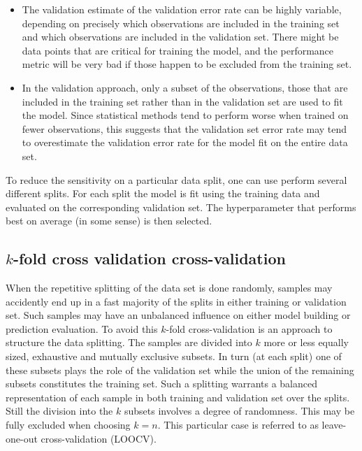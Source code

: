 \documentclass[%
oneside,                 %
final,                   %
10pt]{article}
\begin{document}
\begin{itemize}
\item The validation estimate of the validation error rate can be highly variable, depending on precisely which observations are included in the training set and which observations are included in the validation set. There might be data points that are critical for training the model, and the performance metric will be very bad if those happen to be excluded from the training set.

\item In the validation approach, only a subset of the observations, those that are included in the training set rather than in the validation set are used to fit the model. Since statistical methods tend to perform worse when trained on fewer observations, this suggests that the validation set error rate may tend to overestimate the validation error rate for the model fit on the entire data set.
\end{itemize}

\noindent
To reduce the sensitivity on a particular data split, one can use perform several different splits. For each split the model is fit using the training data and
evaluated on the corresponding validation set. The hyperparameter that performs best on average (in some sense) is then selected.


\subsection{$k$-fold cross validation cross-validation}

When the repetitive splitting of the data set is done randomly,
samples may accidently end up in a fast majority of the splits in
either training or validation set. Such samples may have an unbalanced
influence on either model building or prediction evaluation. To avoid
this $k$-fold cross-validation is an approach to structure the data splitting. The
samples are divided into $k$ more or less equally sized, exhaustive and
mutually exclusive subsets. In turn (at each split) one of these
subsets plays the role of the validation set while the union of the
remaining subsets constitutes the training set. Such a splitting
warrants a balanced representation of each sample in both training and
validation set over the splits. Still the division into the $k$ subsets
involves a degree of randomness. This may be fully excluded when
choosing $k=n$. This particular case is referred to as leave-one-out
cross-validation (LOOCV). 
\end{document}
